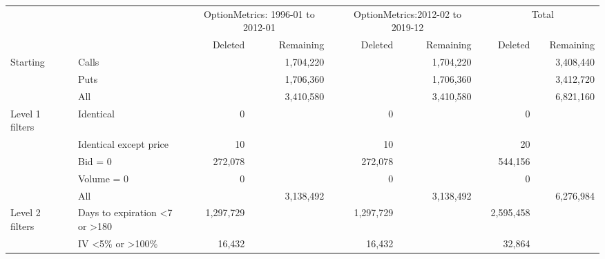 

    \begin{tabular}{*{4}{l} *{11}{r} }
       
        
         \multicolumn{4}{c}{}  & \multicolumn{3}{c}{OptionMetrics: 1996-01 to 2012-01}  &  \multicolumn{1}{c}{} & 
         \multicolumn{3}{c}{OptionMetrics:2012-02 to 2019-12}&  \multicolumn{1}{c}{}  &
          \multicolumn{3}{c}{Total}  \\
         \cline{5-7}
                  
         \cline{9-11}
         \cline{13-15}
         
          &  & & & 
          Deleted &  & Remaining & &
          Deleted &  & Remaining & &
          Deleted &  & Remaining 
          \\

       \hline

	
				Starting & & Calls & &
				 & & 1,704,220 & &
				 & & 1,704,220 & &
				 & & 3,408,440 \\
			
				  & & Puts & &
				 & & 1,706,360 & &
				 & & 1,706,360 & &
				 & & 3,412,720 \\
			
				  & & All & &
				 & & 3,410,580 & &
				 & & 3,410,580 & &
				 & & 6,821,160 \\
			
				Level 1 filters & & Identical & &
				0 & &  & &
				0 & &  & &
				0 & &  \\
			
				  & & Identical except price & &
				10 & &  & &
				10 & &  & &
				20 & &  \\
			
				  & & Bid = 0 & &
				272,078 & &  & &
				272,078 & &  & &
				544,156 & &  \\
			
				  & & Volume = 0 & &
				0 & &  & &
				0 & &  & &
				0 & &  \\
			
				  & & All & &
				 & & 3,138,492 & &
				 & & 3,138,492 & &
				 & & 6,276,984 \\
			
				Level 2 filters & & Days to expiration <7 or >180 & &
				1,297,729 & &  & &
				1,297,729 & &  & &
				2,595,458 & &  \\
			
				  & & IV <5\% or >100\% & &
				16,432 & &  & &
				16,432 & &  & &
				32,864 & &  \\
			

\end{tabular}
